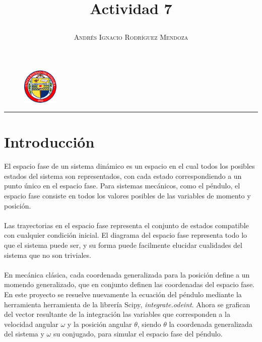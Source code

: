 \documentclass[11pt,spanish]{article}
\title{\vspace{-3cm}\begin{flushleft}\textbf{Actividad 7}\end{flushleft}}
\author{\hspace{-9.6cm}\textsc{Andrés Ignacio Rodríguez Mendoza}}
\date{}
\begin{document}
\begin{figure}
  \begin{center}
   \vspace{-5.4cm} \includegraphics[width=0.15\textwidth]{uni}
  \end{center}
\end{figure}

\maketitle  
\begin{center}
\rule{\textwidth}{1pt}
\end{center}

\section*{Introducción}

El espacio fase de un sistema dinámico es un espacio en el cual todos los posibles estados del sistema son representados, con cada estado correspondiendo a un punto único en el espacio fase. Para sistemas mecánicos, como el péndulo, el espacio fase consiste en todos los valores posibles de las variables de momento y posición.\\ \\
Las trayectorias en el espacio fase representa el conjunto de estados compatible con cualquier condición inicial. El diagrama del espacio fase representa todo lo que el sistema puede ser, y su forma puede facilmente elucidar cualidades del sistema que no son triviales. \\ \\
En mecánica clásica, cada coordenada generalizada para la posición define a un momendo generalizado, que en conjunto definen las coordenadas del espacio fase. En este proyecto se resuelve nuevamente la ecuación del péndulo mediante la herramienta herramienta de la librería Scipy, \textit{integrate.odeint}. Ahora se grafican del vector resultante de la integración las variables que corresponden a la velocidad angular $\omega$ y la posición angular $\theta$, siendo $\theta$ la coordenada generalizada del sistema y $\omega$ su conjugado, para simular el espacio fase del péndulo.
\end{document}

